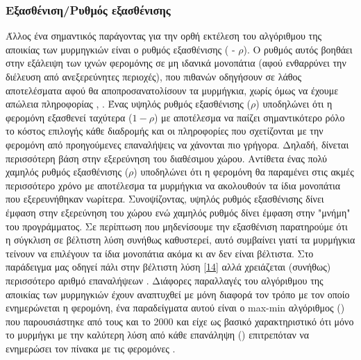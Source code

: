 \subsubsection{Εξασθένιση/Ρυθμός εξασθένισης}
Άλλος ένα σημαντικός παράγοντας για την ορθή εκτέλεση του αλγόριθμου της αποικίας των μυρμηγκιών είναι ο ρυθμός εξασθένισης ( - $ρ$). Ο ρυθμός αυτός βοηθάει στην εξάλειψη των ιχνών φερομόνης σε μη ιδανικά μονοπάτια (αφού ενθαρρύνει την διέλευση από ανεξερεύνητες περιοχές), που πιθανών οδηγήσουν σε λάθος αποτελέσματα αφού θα αποπροσανατολίσουν τα μυρμήγκια, χωρίς όμως να έχουμε απώλεια πληροφορίας \cite{mavrovouniotis2014ant}, \cite{mpikou2013euretikoi}. Ένας υψηλός ρυθμός εξασθένισης ($ρ$) υποδηλώνει ότι η φερομόνη εξασθενεί ταχύτερα ($1-ρ$) με αποτέλεσμα να παίζει σημαντικότερο ρόλο το κόστος επιλογής κάθε διαδρομής και οι πληροφορίες που σχετίζονται με την φερομόνη από προηγούμενες επαναλήψεις να χάνονται πιο γρήγορα. Δηλαδή, δίνεται περισσότερη βάση στην εξερεύνηση του διαθέσιμου χώρου. Αντίθετα ένας πολύ χαμηλός ρυθμός εξασθένισης ($ρ$) υποδηλώνει ότι η φερομόνη θα παραμένει στις ακμές περισσότερο χρόνο με αποτέλεσμα τα μυρμήγκια να ακολουθούν τα ίδια μονοπάτια που εξερευνήθηκαν νωρίτερα.
Συνοψίζοντας, υψηλός ρυθμός εξασθένισης δίνει έμφαση στην εξερεύνηση του χώρου ενώ χαμηλός ρυθμός δίνει έμφαση στην "μνήμη" του προγράμματος. Σε περίπτωση που μηδενίσουμε την εξασθένιση παρατηρούμε ότι η σύγκλιση σε βέλτιστη λύση συνήθως καθυστερεί, αυτό συμβαίνει γιατί τα μυρμήγκια τείνουν να επιλέγουν τα ίδια μονοπάτια ακόμα κι αν δεν είναι βέλτιστα. Στο παράδειγμα μας οδηγεί πάλι στην βέλτιστη λύση \ref{14} αλλά χρειάζεται (συνήθως) περισσότερο αριθμό επαναλήψεων \cite{mpikou2013euretikoi}. Διάφορες παραλλαγές του αλγόριθμου της αποικίας των μυρμηγκιών έχουν αναπτυχθεί με μόνη διαφορά τον τρόπο με τον οποίο ενημερώνεται η φερομόνη, ένα παραδείγματα αυτού είναι ο max-min αλγόριθμος () που παρουσιάστηκε από τους  και  το 2000 και είχε ως βασικό χαρακτηριστικό ότι μόνο το μυρμήγκι με την καλύτερη λύση από κάθε επανάληψη () επιτρεπόταν να ενημερώσει τον πίνακα με τις φερομόνες \cite{stutzle2000max}.


